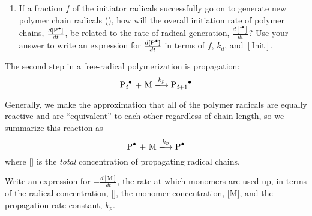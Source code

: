 \begin{activity}
\begin{ctqs}
\begin{enumerate}
				\begin{solution}[1in]\end{solution}
		
			\item If a fraction $f$ of the initiator radicals successfully go on to generate new polymer chain radicals (), how will the overall initiation rate of polymer chains, $\frac{d[\text{\ce{P^.}}]}{dt}$, be related to the rate of radical generation, $\frac{d[\text{I}^\bullet]}{dt}$?  Use your answer to write an expression for $\frac{d[\text{\ce{P^.}}]}{dt}$ in terms of $f$, $k_d$, and $[\text{Init}]$.
		
				\begin{solution}[1.25in]\end{solution}
		
		\end{enumerate}
		
	\question The second step in a free-radical polymerization is propagation:
		\begin{equation*}
			\text{\ce{P_i^.} + M} \xlongrightarrow{k_p} \text{\ce{P_{i+1}^.}}
		\end{equation*}
		
		Generally, we make the approximation that all of the polymer radicals are equally reactive and are ``equivalent'' to each other regardless of chain length, so we summarize this reaction as
		\begin{equation*}
			\text{\ce{P^.} + M} \xlongrightarrow{k_p} \text{\ce{P^.}}
		\end{equation*}
		where [] is the \emph{total} concentration of propagating radical chains.
	
		Write an expression for $-\frac{d[\text{M}]}{dt}$, the rate at which monomers are used up, in terms of the radical concentration, [], the monomer concentration, [M], and the propagation rate constant, $k_p$.
		
		\begin{solution}[1.25in]\end{solution}
		

\end{ctqs}
\end{activity}

